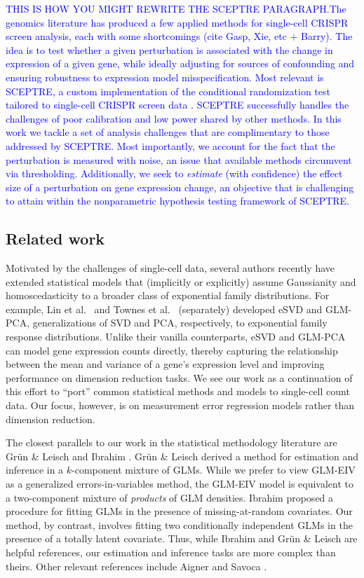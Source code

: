 \documentclass[12pt]{article}
\begin{document}
\textcolor{blue}{THIS IS HOW YOU MIGHT REWRITE THE SCEPTRE PARAGRAPH.The genomics literature has produced a few applied methods for single-cell CRISPR screen analysis, each with some shortcomings (cite Gasp, Xie, etc + Barry). The idea is to test whether a given perturbation is associated with the change in expression of a given gene, while ideally adjusting for sources of confounding and ensuring robustness to expression model misspecification. Most relevant is SCEPTRE, a custom implementation of the conditional randomization test \parencite{Candes2018, Liu2021} tailored to single-cell CRISPR screen data \parencite{Barry2021}.  SCEPTRE successfully handles the challenges of poor calibration and low power shared by other methods.  In this work we tackle a set of analysis challenges that are complimentary to those addressed by SCEPTRE. Most importantly,  we account for the fact that the perturbation is measured with noise, an issue that available methods circumvent via thresholding. Additionally, we seek to \textit{estimate} (with confidence) the effect size of a perturbation on gene expression change, an objective that is challenging to attain within the nonparametric hypothesis testing framework of SCEPTRE.}
\fi

\subsection{Related work}
Motivated by the challenges of single-cell data, several authors recently have extended statistical models that (implicitly or explicitly) assume Gaussianity and homoscedasticity to a broader class of exponential family distributions. For example, Lin et al.\ \parencite{Lin2021} and Townes et al.\ \parencite{Townes2019}  (separately) developed eSVD and GLM-PCA, generalizations of SVD and PCA, respectively, to exponential family response distributions. Unlike their vanilla counterparts, eSVD and GLM-PCA can model gene expression counts directly, thereby capturing the relationship between the mean and variance of a gene's expression level \parencite{Lause2021} and improving performance on dimension reduction tasks. We see our work as a continuation of this effort to ``port'' common statistical methods and models to single-cell count data. Our focus, however, is on measurement error regression models rather than dimension reduction.

The closest parallels to our work in the statistical methodology literature are Gr\"{u}n \& Leisch \cite{Grun2008} and Ibrahim \cite{Ibrahim1990}. Gr\"{u}n \& Leisch derived a method for estimation and inference in a $k$-component mixture of GLMs. While we prefer to view GLM-EIV as a generalized errors-in-variables method,  the GLM-EIV model is equivalent to a two-component mixture of \textit{products} of GLM densities. Ibrahim proposed a procedure for fitting GLMs in the presence of missing-at-random covariates. Our method, by contrast, involves fitting two conditionally independent GLMs in the presence of a totally latent covariate. Thus, while Ibrahim and Gr\"{u}n \& Leisch are helpful references, our estimation and inference tasks are more complex than theirs. Other relevant references include Aigner \cite{Aigner1973} and Savoca \cite{Savoca2000}.
\end{document}
